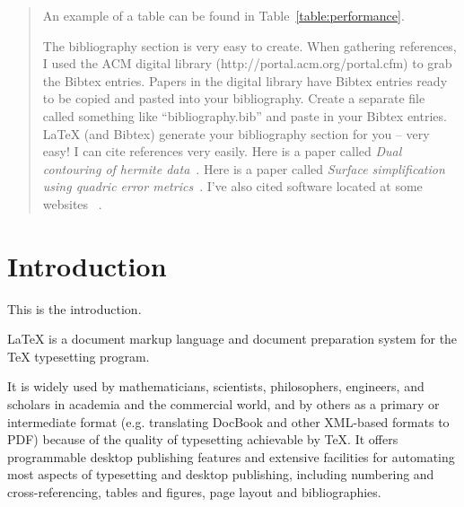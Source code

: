 \documentclass[12pt]{ucthesis}
\begin{document}
\begin{frontmatter}
\begin{abstract}
An example of a table can be found in Table~\ref{table:performance}.

The bibliography section is very easy to create.  When gathering references, I used the ACM digital library (http://portal.acm.org/portal.cfm) to grab the Bibtex entries.  Papers in the digital library have Bibtex entries ready to be copied and pasted into your bibliography.  Create a separate file called something like ``bibliography.bib'' and paste in your Bibtex entries.  LaTeX (and Bibtex) generate your bibliography section for you -- very easy! I can cite references very easily.  Here is a paper called \emph{Dual contouring of hermite data}~\cite{DualContouring}.  Here is a paper called \emph{Surface simplification using quadric error metrics}~\cite{QuadricErrorMetrics}.  I've also cited software located at some websites \cite{NormalMapper}~\cite{nVidiaMelody}.


\end{abstract}





\tableofcontents


\listoftables

\listoffigures

\end{frontmatter}

\pagestyle{plain}




\renewcommand{\baselinestretch}{1.66}







\chapter{Introduction}
\label{intro}


This is the introduction.

LaTeX is a document markup language and document preparation system for the TeX typesetting program.

It is widely used by mathematicians, scientists, philosophers, engineers, and scholars in academia and the commercial world, and by others as a primary or intermediate format (e.g. translating DocBook and other XML-based formats to PDF) because of the quality of typesetting achievable by TeX. It offers programmable desktop publishing features and extensive facilities for automating most aspects of typesetting and desktop publishing, including numbering and cross-referencing, tables and figures, page layout and bibliographies.
\end{document}
